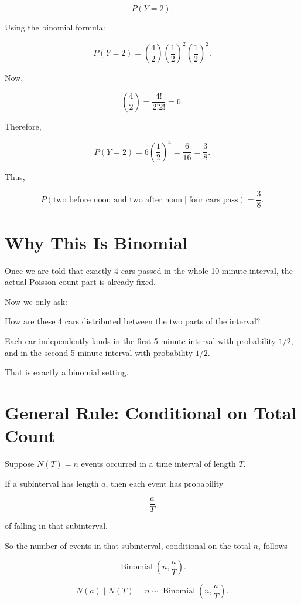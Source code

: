 \documentclass[12pt]{article}
\begin{document}
\[
P(Y=2).
\]

Using the binomial formula:

\[
P(Y=2)=\binom{4}{2}
\left(\frac{1}{2}\right)^2
\left(\frac{1}{2}\right)^2.
\]

Now,

\[
\binom{4}{2}=\frac{4!}{2!2!}=6.
\]

Therefore,

\[
P(Y=2)=6\left(\frac{1}{2}\right)^4
=\frac{6}{16}
=\frac{3}{8}.
\]

Thus,

\[
\boxed{P(\text{two before noon and two after noon}\mid \text{four cars pass})=\frac{3}{8}.}
\]

\section{Why This Is Binomial}

Once we are told that exactly 4 cars passed in the whole 10-minute interval, the actual Poisson count part is already fixed.

Now we only ask:

\begin{center}
How are these 4 cars distributed between the two parts of the interval?
\end{center}

Each car independently lands in the first 5-minute interval with probability \(1/2\), and in the second 5-minute interval with probability \(1/2\).

That is exactly a binomial setting.

\section{General Rule: Conditional on Total Count}

Suppose \(N(T)=n\) events occurred in a time interval of length \(T\).

If a subinterval has length \(a\), then each event has probability

\[
\frac{a}{T}
\]

of falling in that subinterval.

So the number of events in that subinterval, conditional on the total \(n\), follows

\[
\operatorname{Binomial}\left(n,\frac{a}{T}\right).
\]

\[
\boxed{
N(a)\mid N(T)=n
\sim
\operatorname{Binomial}\left(n,\frac{a}{T}\right).
}
\]
\end{document}
